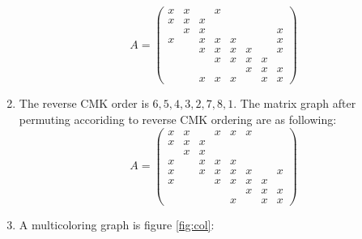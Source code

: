\documentclass{ctexart}
\begin{document}
\begin{solution}
\begin{enumerate}
     \[
A =
\begin{pmatrix}
 x & x &   &  x &   &   &   &  \\
x &  x & x &   &   &  &  &   \\
  & x &  x   &  &   &  &   & x  \\
 x &   & x &  x & x &   &   &  x \\
  &   &  x & x &  x & x &   &   x\\
  &  &  & x & x &  x & x &   \\
  &  &   &   &   & x &  x &x \\
 &  &x   &   x&  x &   & x & x 
\end{pmatrix}
\]
\item The reverse CMK order is \(6,5,4,3,2,7,8,1 \). The matrix graph 
  after permuting accoriding to reverse CMK ordering are as following: 
       \[
A =
\begin{pmatrix}
 x & x &   &  x &  x & x  &   &  \\
x &  x & x &   &   &  &  &   \\
  & x &  x   &  &   &  &   &   \\
 x &   & x &  x & x &   &   &   \\
 x &   &  x & x &  x & x &   &   x\\
 x &  &  & x & x &  x & x &   \\
  &  &   &   &   & x &  x &x \\
 &  &   &   &  x &   & x & x 
\end{pmatrix}
\]
\item A multicoloring graph is figure \ref{fig:col}: 
  \begin{figure}[!htbp]
    \centering
\end{figure}
\end{enumerate}
\end{solution}
\end{document}
